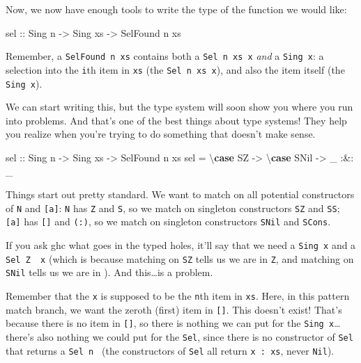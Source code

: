 \documentclass[]{article}
\newenvironment{Shaded}{}{}
\newcommand{\DataTypeTok}[1]{\textcolor[rgb]{0.56,0.13,0.00}{#1}}
\newcommand{\FunctionTok}[1]{\textcolor[rgb]{0.02,0.16,0.49}{#1}}
\newcommand{\KeywordTok}[1]{\textcolor[rgb]{0.00,0.44,0.13}{\textbf{#1}}}
\newcommand{\NormalTok}[1]{#1}
\newcommand{\OtherTok}[1]{\textcolor[rgb]{0.00,0.44,0.13}{#1}}
\begin{document}
Now, we now have enough tools to write the type of the function we would like:

\begin{Shaded}
\begin{Highlighting}[]
\OtherTok{sel ::} \DataTypeTok{Sing}\NormalTok{ n}
    \OtherTok{->} \DataTypeTok{Sing}\NormalTok{ xs}
    \OtherTok{->} \DataTypeTok{SelFound}\NormalTok{ n xs}
\end{Highlighting}
\end{Shaded}

Remember, a \texttt{SelFound\ n\ xs} contains both a \texttt{Sel\ n\ xs\ x}
\emph{and} a \texttt{Sing\ x}: a selection into the \texttt{i}th item in
\texttt{xs} (the \texttt{Sel\ n\ xs\ x}), and also the item itself (the
\texttt{Sing\ x}).

We can start writing this, but the type system will soon show you where you run
into problems. And that's one of the best things about type systems! They help
you realize when you're trying to do something that doesn't make sense.

\begin{Shaded}
\begin{Highlighting}[]
\OtherTok{sel ::} \DataTypeTok{Sing}\NormalTok{ n}
    \OtherTok{->} \DataTypeTok{Sing}\NormalTok{ xs}
    \OtherTok{->} \DataTypeTok{SelFound}\NormalTok{ n xs}
\NormalTok{sel }\FunctionTok{=}\NormalTok{ \textbackslash{}}\KeywordTok{case}
    \DataTypeTok{SZ} \OtherTok{->}\NormalTok{ \textbackslash{}}\KeywordTok{case}
      \DataTypeTok{SNil} \OtherTok{->}\NormalTok{ _ }\FunctionTok{:&:}\NormalTok{ _}
\end{Highlighting}
\end{Shaded}

Things start out pretty standard. We want to match on all potential constructors
of \texttt{N} and \texttt{{[}a{]}}: \texttt{N} has \texttt{Z} and \texttt{S}, so
we match on singleton constructors \texttt{SZ} and \texttt{SS}; \texttt{{[}a{]}}
has \texttt{{[}{]}} and \texttt{(:)}, so we match on singleton constructors
\texttt{SNil} and \texttt{SCons}.

If you ask ghc what goes in the typed holes, it'll say that we need a
\texttt{Sing\ x} and a
\texttt{Sel\ \textquotesingle{}Z\ \textquotesingle{}{[}{]}\ x} (which is because
matching on \texttt{SZ} tells us we are in \texttt{\textquotesingle{}Z}, and
matching on \texttt{SNil} tells us we are in \texttt{\textquotesingle{}{[}{]}}).
And this\ldots{}is a problem.

Remember that the \texttt{x} is supposed to be the \texttt{n}th item in
\texttt{xs}. Here, in this pattern match branch, we want the zeroth (first) item
in \texttt{{[}{]}}. This doesn't exist! That's because there is no item in
\texttt{{[}{]}}, so there is nothing we can put for the
\texttt{Sing\ x}\ldots{}there's also nothing we could put for the \texttt{Sel},
since there is no constructor of \texttt{Sel} that returns a
\texttt{Sel\ n\ \textquotesingle{}{[}{]}} (the constructors of \texttt{Sel} all
return \texttt{x\ \textquotesingle{}:\ xs}, never \texttt{Nil}).
\end{document}
